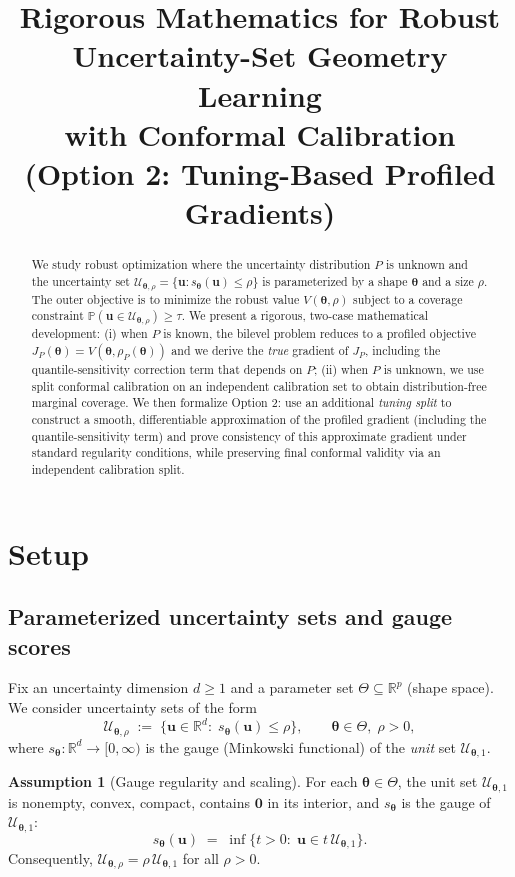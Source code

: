 \documentclass[11pt]{article}
\title{Rigorous Mathematics for Robust Uncertainty-Set Geometry Learning\\
with Conformal Calibration (Option 2: Tuning-Based Profiled Gradients)}
\author{}
\date{}
\newcommand{\R}{\mathbb{R}}
\newcommand{\Prob}{\mathbb{P}}
\newcommand{\cU}{\mathcal{U}}
\newcommand{\btheta}{\bm{\theta}}
\newcommand{\bu}{\bm{u}}
\theoremstyle{plain}
\theoremstyle{definition}
\newtheorem{assumption}[theorem]{Assumption}
\begin{document}
\maketitle

\begin{abstract}
We study robust optimization where the uncertainty distribution $P$ is unknown and the uncertainty set
$\cU_{\btheta,\rho}=\{\bu: s_{\btheta}(\bu)\le \rho\}$ is parameterized by a shape $\btheta$ and a size $\rho$.
The outer objective is to minimize the robust value $V(\btheta,\rho)$ subject to a coverage constraint
$\Prob(\bu\in \cU_{\btheta,\rho})\ge \tau$.
We present a rigorous, two-case mathematical development:
(i) when $P$ is known, the bilevel problem reduces to a profiled objective $J_P(\btheta)=V(\btheta,\rho_P(\btheta))$ and we derive the \emph{true} gradient of $J_P$,
including the quantile-sensitivity correction term that depends on $P$; (ii) when $P$ is unknown, we use split conformal calibration on an independent calibration set to obtain distribution-free marginal coverage.
We then formalize Option 2: use an additional \emph{tuning split} to construct a smooth, differentiable approximation of the profiled gradient (including the quantile-sensitivity term) and prove consistency of this approximate gradient under standard regularity conditions, while preserving final conformal validity via an independent calibration split.
\end{abstract}

\section{Setup}

\subsection{Parameterized uncertainty sets and gauge scores}

Fix an uncertainty dimension $d\ge 1$ and a parameter set $\Theta\subseteq \R^p$ (shape space).
We consider uncertainty sets of the form
\begin{equation}\label{eq:uset}
\cU_{\btheta,\rho} \;:=\; \{\bu\in \R^d:\; s_{\btheta}(\bu)\le \rho\},
\qquad \btheta\in\Theta,\;\rho>0,
\end{equation}
where $s_{\btheta}:\R^d\to [0,\infty)$ is the gauge (Minkowski functional) of the \emph{unit} set $\cU_{\btheta,1}$.

\begin{assumption}[Gauge regularity and scaling]\label{asm:gauge}
For each $\btheta\in\Theta$, the unit set $\cU_{\btheta,1}$ is nonempty, convex, compact, contains $\bm{0}$ in its interior, and
$s_{\btheta}$ is the gauge of $\cU_{\btheta,1}$:
\[
s_{\btheta}(\bu) \;=\; \inf\{t>0:\; \bu\in t\,\cU_{\btheta,1}\}.
\]
Consequently, $\cU_{\btheta,\rho}=\rho\,\cU_{\btheta,1}$ for all $\rho>0$.
\end{assumption}
\end{document}
